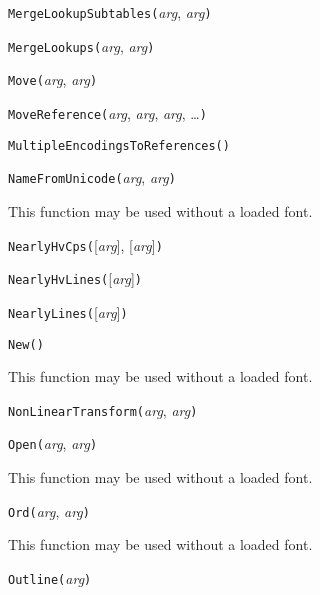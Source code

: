 \noindent\texttt{MergeLookupSubtables(}\textit{arg}, \textit{arg}\texttt{)}


\noindent\texttt{MergeLookups(}\textit{arg}, \textit{arg}\texttt{)}


\noindent\texttt{Move(}\textit{arg}, \textit{arg}\texttt{)}


\noindent\texttt{MoveReference(}\textit{arg}, \textit{arg}, \textit{arg}, \ldots\texttt{)}


\noindent\texttt{MultipleEncodingsToReferences(}\texttt{)}


\noindent\texttt{NameFromUnicode(}\textit{arg}, \textit{arg}\texttt{)}

This function may be used without a loaded font.


\noindent\texttt{NearlyHvCps(}[\textit{arg}], [\textit{arg}]\texttt{)}


\noindent\texttt{NearlyHvLines(}[\textit{arg}]\texttt{)}


\noindent\texttt{NearlyLines(}[\textit{arg}]\texttt{)}


\noindent\texttt{New(}\texttt{)}

This function may be used without a loaded font.


\noindent\texttt{NonLinearTransform(}\textit{arg}, \textit{arg}\texttt{)}


\noindent\texttt{Open(}\textit{arg}, \textit{arg}\texttt{)}

This function may be used without a loaded font.


\noindent\texttt{Ord(}\textit{arg}, \textit{arg}\texttt{)}

This function may be used without a loaded font.


\noindent\texttt{Outline(}\textit{arg}\texttt{)}

